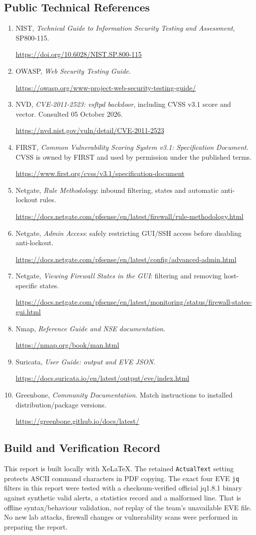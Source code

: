 \documentclass[11pt,a4paper]{article}
\newcommand{\referenceurl}[1]{\par{\footnotesize\ttfamily\href{#1}{#1}}\par}
\begin{document}
\subsection{Public Technical References}
\begin{enumerate}
\item NIST, \emph{Technical Guide to Information Security Testing and Assessment}, SP800-115. \referenceurl{https://doi.org/10.6028/NIST.SP.800-115}
\item OWASP, \emph{Web Security Testing Guide}. \referenceurl{https://owasp.org/www-project-web-security-testing-guide/}
\item NVD, \emph{CVE-2011-2523: vsftpd backdoor}, including CVSS v3.1 score and vector. Consulted 05 October 2026. \referenceurl{https://nvd.nist.gov/vuln/detail/CVE-2011-2523}
\item FIRST, \emph{Common Vulnerability Scoring System v3.1: Specification Document}. CVSS is owned by FIRST and used by permission under the published terms. \referenceurl{https://www.first.org/cvss/v3.1/specification-document}
\item Netgate, \emph{Rule Methodology}: inbound filtering, states and automatic anti-lockout rules. \referenceurl{https://docs.netgate.com/pfsense/en/latest/firewall/rule-methodology.html}
\item Netgate, \emph{Admin Access}: safely restricting GUI/SSH access before disabling anti-lockout. \referenceurl{https://docs.netgate.com/pfsense/en/latest/config/advanced-admin.html}
\item Netgate, \emph{Viewing Firewall States in the GUI}: filtering and removing host-specific states. \referenceurl{https://docs.netgate.com/pfsense/en/latest/monitoring/status/firewall-states-gui.html}
\item Nmap, \emph{Reference Guide and NSE documentation}. \referenceurl{https://nmap.org/book/man.html}
\item Suricata, \emph{User Guide: output and EVE JSON}. \referenceurl{https://docs.suricata.io/en/latest/output/eve/index.html}
\item Greenbone, \emph{Community Documentation}. Match instructions to installed distribution/package versions. \referenceurl{https://greenbone.github.io/docs/latest/}
\end{enumerate}

\subsection{Build and Verification Record}
This report is built locally with XeLaTeX. The retained \texttt{ActualText} setting protects ASCII command characters in PDF copying. The exact four EVE \texttt{jq} filters in this report were tested with a checksum-verified official jq1.8.1 binary against synthetic valid alerts, a statistics record and a malformed line. That is offline syntax/behaviour validation, \emph{not} replay of the team's unavailable EVE file. No new lab attacks, firewall changes or vulnerability scans were performed in preparing the report.
\end{document}
